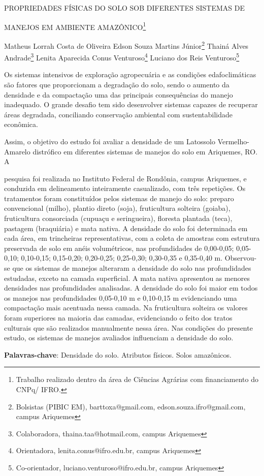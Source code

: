 \documentclass[article,12pt,onesidea,4paper,english,brazil]{abntex2}
\begin{document}
	
	
	\frenchspacing 
	
	\begin{center}
		\LARGE PROPRIEDADES FÍSICAS DO SOLO SOB DIFERENTES SISTEMAS DE
		
		MANEJOS EM AMBIENTE AMAZÔNICO\footnote{Trabalho realizado dentro da área de Ciências Agrárias com financiamento do CNPq/ IFRO.}
		
		\normalsize
		Matheus Lorrah Costa de Oliveira 
		Edson Souza Martins Júnior\footnote{Bolsistas (PIBIC EM), barttoxa@gmail.com, edson.souza.ifro@gmail.com, campus Ariquemes} 
		Thainá Alves Andrade\footnote{Colaboradora, thaina.taa@hotmail.com, campus Ariquemes} 
		Lenita Aparecida Conus Venturoso\footnote{Orientadora, lenita.conus@ifro.edu.br, campus Ariquemes}
		Luciano dos Reis Venturoso\footnote{Co-orientador, luciano.venturoso@ifro.edu.br, campus Ariquemes} 
	\end{center}
	
	\noindent Os sistemas intensivos de exploração agropecuária e as condições edafoclimáticas
	são fatores que proporcionam a degradação do solo, sendo o aumento da densidade
	e da compactação uma das principais consequências do manejo inadequado. O
	grande desafio tem sido desenvolver sistemas capazes de recuperar áreas
	degradada, conciliando conservação ambiental com sustentabilidade econômica.
	
	Assim, o objetivo do estudo foi avaliar a densidade de um Latossolo Vermelho-
	Amarelo distrófico em diferentes sistemas de manejos do solo em Ariquemes, RO. A
	
	pesquisa foi realizada no Instituto Federal de Rondônia, campus Ariquemes, e
	conduzida em delineamento inteiramente casualizado, com três repetições. Os
	tratamentos foram constituídos pelos sistemas de manejo do solo: preparo
	convencional (milho), plantio direto (soja), fruticultura solteira (goiaba), fruticultura
	consorciada (cupuaçu e seringueira), floresta plantada (teca), pastagem (braquiária)
	e mata nativa. A densidade do solo foi determinada em cada área, em trincheiras
	representativas, com a coleta de amostras com estrutura preservada de solo em
	anéis volumétricos, nas profundidades de 0,00-0,05; 0,05-0,10; 0,10-0,15; 0,15-0,20;
	0,20-0,25; 0,25-0,30; 0,30-0,35 e 0,35-0,40 m. Observou-se que os sistemas de
	manejos alteraram a densidade do solo nas profundidades estudadas, exceto na
	camada superficial. A mata nativa apresentou as menores densidades nas
	profundidades analisadas. A densidade do solo foi maior em todos os manejos nas
	profundidades 0,05-0,10 m e 0,10-0,15 m evidenciando uma compactação mais
	acentuada nessa camada. Na fruticultura solteira os valores foram superiores na
	maioria das camadas, evidenciando o feito dos tratos culturais que são realizados
	manualmente nessa área. Nas condições do presente estudo, os sistemas de
	manejos avaliados influenciam a densidade do solo.
	
	\vspace{\onelineskip}
	
	\noindent
	\textbf{Palavras-chave}: Densidade do solo. Atributos físicos. Solos amazônicos.
	
\end{document}
